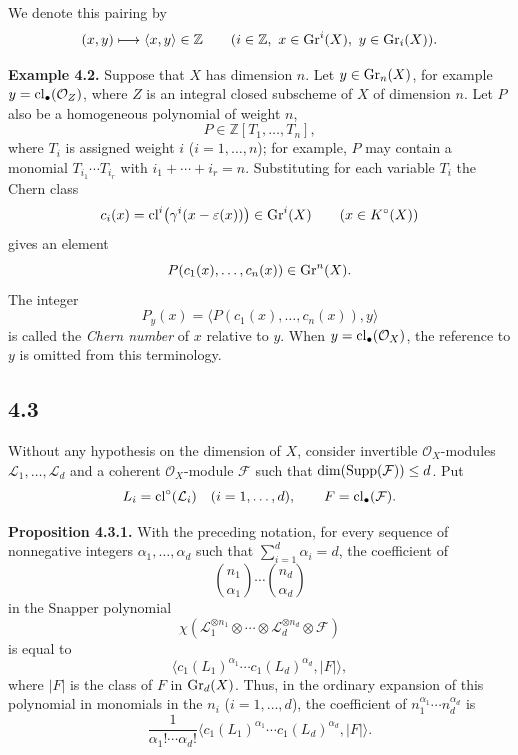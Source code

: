 We denote this pairing by
\[
(x,y)\longmapsto\langle x,y\rangle\in\mathbb Z
\qquad(i\in\mathbb Z,\ x\in\operatorname{Gr}^i(X),\ y\in\operatorname{Gr}_i(X)).
\]

\textbf{Example 4.2.}
Suppose that $X$ has dimension $n$. Let $y\in\operatorname{Gr}_n(X)$, for example
$y=\operatorname{cl}_\bullet(\mathcal O_Z)$, where $Z$ is an integral closed subscheme of
$X$ of dimension $n$. Let $P$ also be a homogeneous polynomial of weight $n$,
\[
P\in\mathbb Z[T_1,\ldots,T_n],
\]
where $T_i$ is assigned weight $i$ ($i=1,\ldots,n$); for example, $P$ may
contain a monomial $T_{i_1}\cdots T_{i_r}$ with
$i_1+\cdots+i_r=n$. Substituting for each variable $T_i$ the Chern class
\[
c_i(x)=\operatorname{cl}^i\bigl(\gamma^i(x-\varepsilon(x))\bigr)\in\operatorname{Gr}^i(X)
\qquad(x\in K^\circ(X))
\]
gives an element
\[
P(c_1(x),\ldots,c_n(x))\in\operatorname{Gr}^n(X).
\]
The integer
\[
P_y(x)=\bigl\langle P(c_1(x),\ldots,c_n(x)),y\bigr\rangle
\]
is called the \emph{Chern number} of $x$ relative to $y$. When
$y=\operatorname{cl}_\bullet(\mathcal O_X)$, the reference to $y$ is omitted from this
terminology.

\subsection*{4.3}
Without any hypothesis on the dimension of $X$, consider invertible
$\mathcal O_X$-modules $\mathcal L_1,\ldots,\mathcal L_d$ and a coherent
$\mathcal O_X$-module $\mathcal F$ such that
$\dim(\operatorname{Supp}(\mathcal F))\leq d$. Put
\[
L_i=\operatorname{cl}^\circ(\mathcal L_i)\quad(i=1,\ldots,d),
\qquad F=\operatorname{cl}_\bullet(\mathcal F).
\]

\textbf{Proposition 4.3.1.}
With the preceding notation, for every sequence of nonnegative integers
$\alpha_1,\ldots,\alpha_d$ such that
$\sum_{i=1}^d\alpha_i=d$, the coefficient of
\[
\binom{n_1}{\alpha_1}\cdots\binom{n_d}{\alpha_d}
\]
in the Snapper polynomial
\[
\chi(\mathcal L_1^{\otimes n_1}\otimes\cdots\otimes
\mathcal L_d^{\otimes n_d}\otimes\mathcal F)
\]
is equal to
\begin{equation}\tag{4.3.2}
\bigl\langle c_1(L_1)^{\alpha_1}\cdots
c_1(L_d)^{\alpha_d},\lvert F\rvert\bigr\rangle,
\end{equation}
where $\lvert F\rvert$ is the class of $F$ in $\operatorname{Gr}_d(X)$. Thus, in the ordinary
expansion of this polynomial in monomials in the $n_i$ ($i=1,\ldots,d$),
the coefficient of $n_1^{\alpha_1}\cdots n_d^{\alpha_d}$ is
\[
  \frac{1}{\alpha_1!\cdots\alpha_d!}
\bigl\langle c_1(L_1)^{\alpha_1}\cdots
c_1(L_d)^{\alpha_d},\lvert F\rvert\bigr\rangle.
\]

